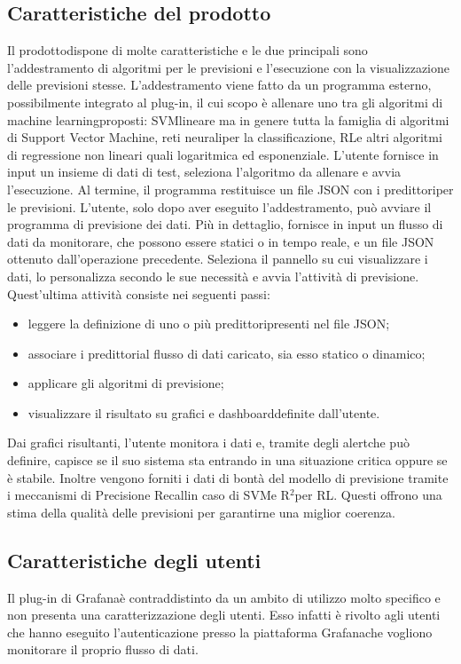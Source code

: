 	\subsection{Caratteristiche del prodotto}
	Il prodotto\glosp dispone di molte caratteristiche e le due principali sono l'addestramento di algoritmi per le previsioni e l'esecuzione con la visualizzazione delle previsioni stesse.
	L'addestramento viene fatto da un programma esterno, possibilmente integrato al plug-in, il cui scopo è allenare uno tra gli algoritmi di machine learning\glosp proposti: SVM\glosp lineare ma in genere tutta la famiglia di algoritmi di Support Vector Machine\glo, reti neurali\glosp per la classificazione, RL\glosp e altri algoritmi di regressione non lineari quali logaritmica ed esponenziale. L'utente fornisce in input un insieme di dati di test, seleziona l'algoritmo da allenare e avvia l'esecuzione. Al termine, il programma restituisce un file JSON con i predittori\glosp per le previsioni.
	L'utente, solo dopo aver eseguito l'addestramento, può avviare il programma di previsione dei dati. Più in dettaglio, fornisce in input un flusso di dati da monitorare, che possono essere statici o in tempo reale, e un file JSON ottenuto dall'operazione precedente. Seleziona il pannello su cui visualizzare i dati, lo personalizza secondo le sue necessità e avvia l'attività di previsione. Quest'ultima attività consiste nei seguenti passi:
	\begin{itemize}
		\item leggere la definizione di uno o più predittori\glosp presenti nel file JSON;
		\item associare i predittori\glosp al flusso di dati caricato, sia esso statico o dinamico;
		\item applicare gli algoritmi di previsione;
		\item visualizzare il risultato su grafici e dashboard\glosp definite dall'utente.
	\end{itemize}
	Dai grafici risultanti, l'utente monitora i dati e, tramite degli alert\glosp che può definire, capisce se il suo sistema sta entrando in una situazione critica oppure se è stabile.
	Inoltre vengono forniti i dati di bontà del modello di previsione tramite i meccanismi di Precision\glosp e Recall\glosp in caso di SVM\glosp e R$^{2}$\glosp per RL\glo. Questi offrono una stima della qualità delle previsioni per garantirne una miglior coerenza.
	\subsection{Caratteristiche degli utenti}
	Il plug-in di Grafana\glosp è contraddistinto da un ambito di utilizzo molto specifico e non presenta una caratterizzazione degli utenti. Esso infatti è rivolto agli utenti che hanno eseguito l'autenticazione presso la piattaforma Grafana\glosp che vogliono monitorare il proprio flusso di dati.

